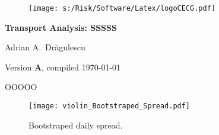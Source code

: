 \documentclass[letterpaper,10pt]{article}
\newcommand{\monthsOut}{OOOOO}
\newcommand{\shortNames}{SSSSS}
\begin{document}
\begin{figure}
\texttt{[image: s:/Risk/Software/Latex/logoCECG.pdf]}
\hfill
{}
\end{figure}
 
\vspace*{0.5in}
\begin{center}
\LARGE\bf{Transport Analysis: \shortNames}
\end{center}
\begin{center}
   Adrian A.\ Dr\u{a}gulescu
\end{center}
\begin{center}
  \small{Version {\bf A}, compiled \today}
\end{center}
\vspace*{1in}

\monthsOut


\clearpage



\clearpage
\begin{figure}
\centerline{
 \texttt{[image: violin\_Bootstraped\_Spread.pdf]}} 
 \caption{Bootstraped daily spread.}
\end{figure}


\clearpage
\end{document}
